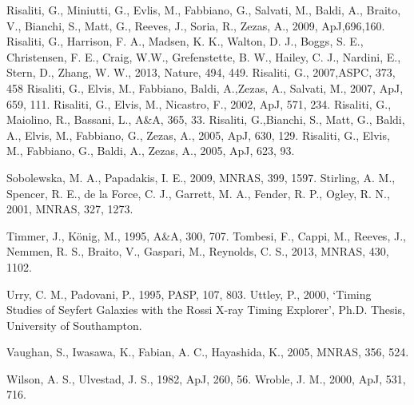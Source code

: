 \documentclass[letters,useAMS,usenatbib]{samnote}
\begin{document}
\begin{thebibliography}{99}
     Risaliti, G., Miniutti, G., Evlis, M., Fabbiano, G., Salvati, M., Baldi, A., Braito, V., 
									 Bianchi, S., Matt, G., Reeves, J., Soria, R., Zezas, A., 2009, ApJ,696,160. 
     Risaliti, G., Harrison, F. A., Madsen, K. K., Walton, D. J., Boggs, S. E., Christensen,  F. E., 
							Craig, W.W., Grefenstette, B. W., Hailey, C. J., Nardini, E., Stern, D., Zhang, W. W., 2013, Nature, 494, 449. 
     Risaliti, G., 2007,ASPC, 373, 458
     Risaliti, G., Elvis, M., Fabbiano, Baldi, A.,Zezas, A., Salvati, M., 2007, ApJ, 659, 111.
     Risaliti, G., Elvis, M., Nicastro, F., 2002, ApJ, 571, 234.
     Risaliti, G., Maiolino, R., Bassani, L., A\&A, 365, 33.
     Risaliti, G.,Bianchi, S., Matt, G., Baldi, A., Elvis, M., Fabbiano, G., Zezas, A., 2005, ApJ,
    630, 129.
     Risaliti, G., Elvis, M., Fabbiano, G., Baldi, A., Zezas, A., 2005, ApJ, 623, 93.
    
     Sobolewska, M. A., Papadakis, I. E., 2009, MNRAS, 399, 1597.
     Stirling, A. M., Spencer, R. E., de la Force, C. J., Garrett, M. A., Fender, R. P., Ogley, R.
N., 2001, MNRAS, 327, 1273.
    
     Timmer, J., K\"{o}nig, M., 1995, A\&A, 300, 707.
     Tombesi, F., Cappi, M., Reeves, J., Nemmen, R. S., Braito, V., Gaspari, M., Reynolds, C. S., 2013,
    MNRAS, 430, 1102.
    
     Urry, C. M., Padovani, P., 1995, PASP, 107, 803.
     Uttley, P., 2000, `Timing Studies of Seyfert Galaxies with the Rossi X-ray Timing Explorer', Ph.D. Thesis,
University of Southampton.
    
     Vaughan, S., Iwasawa, K., Fabian, A. C., Hayashida, K., 2005, MNRAS, 356, 524.
    
     Wilson, A. S., Ulvestad, J. S., 1982, ApJ, 260, 56.
     Wroble, J. M., 2000, ApJ, 531, 716.
    
\end{thebibliography}



\label{lastpage}
\end{document}

